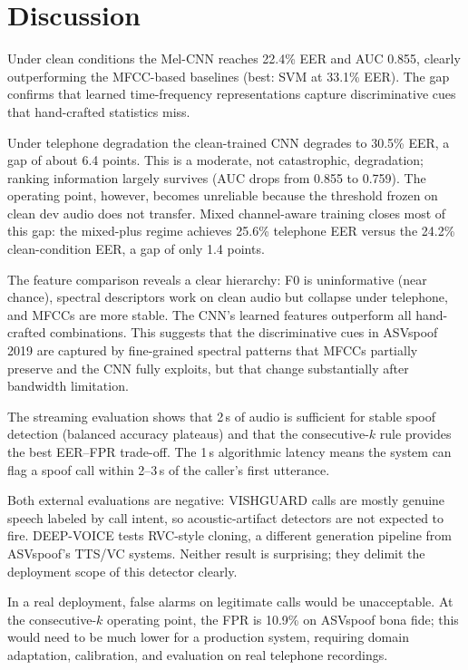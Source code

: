 \documentclass[conference]{IEEEtran}
\begin{document}
\section{Discussion}

Under clean conditions the Mel-CNN reaches 22.4\% EER and AUC 0.855, clearly outperforming the MFCC-based baselines (best: SVM at 33.1\% EER). The gap confirms that learned time-frequency representations capture discriminative cues that hand-crafted statistics miss.

Under telephone degradation the clean-trained CNN degrades to 30.5\% EER, a gap of about 6.4 points. This is a moderate, not catastrophic, degradation; ranking information largely survives (AUC drops from 0.855 to 0.759). The operating point, however, becomes unreliable because the threshold frozen on clean dev audio does not transfer. Mixed channel-aware training closes most of this gap: the mixed-plus regime achieves 25.6\% telephone EER versus the 24.2\% clean-condition EER, a gap of only 1.4 points.

The feature comparison reveals a clear hierarchy: F0 is uninformative (near chance), spectral descriptors work on clean audio but collapse under telephone, and MFCCs are more stable. The CNN's learned features outperform all hand-crafted combinations. This suggests that the discriminative cues in ASVspoof 2019 are captured by fine-grained spectral patterns that MFCCs partially preserve and the CNN fully exploits, but that change substantially after bandwidth limitation.

The streaming evaluation shows that 2\,s of audio is sufficient for stable spoof detection (balanced accuracy plateaus) and that the consecutive-$k$ rule provides the best EER--FPR trade-off. The 1\,s algorithmic latency means the system can flag a spoof call within 2--3\,s of the caller's first utterance.

Both external evaluations are negative: VISHGUARD calls are mostly genuine speech labeled by call intent, so acoustic-artifact detectors are not expected to fire. DEEP-VOICE tests RVC-style cloning, a different generation pipeline from ASVspoof's TTS/VC systems. Neither result is surprising; they delimit the deployment scope of this detector clearly.

In a real deployment, false alarms on legitimate calls would be unacceptable. At the consecutive-$k$ operating point, the FPR is 10.9\% on ASVspoof bona fide; this would need to be much lower for a production system, requiring domain adaptation, calibration, and evaluation on real telephone recordings.
\end{document}
